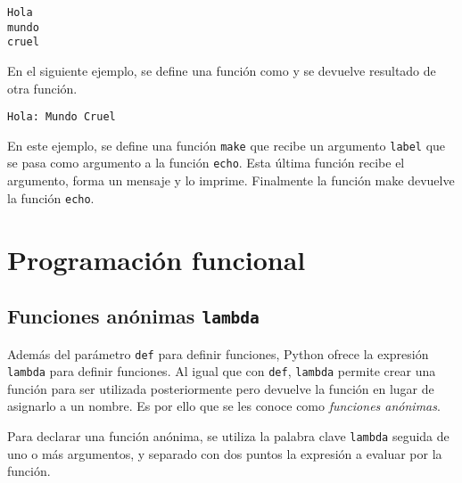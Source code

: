 \begin{verbatim}
Hola
mundo
cruel
\end{verbatim}

En el siguiente ejemplo, se define una función como y se devuelve
resultado de otra función.

\begin{Shaded}
\begin{Highlighting}[]
        \OperatorTok{+} \StringTok{\textquotesingle{}:\textquotesingle{}} \OperatorTok{+}

\OperatorTok{=}\NormalTok{)}
\NormalTok{)}
\end{Highlighting}
\end{Shaded}

\begin{verbatim}
Hola: Mundo Cruel
\end{verbatim}

En este ejemplo, se define una función \texttt{make} que recibe un
argumento \texttt{label} que se pasa como argumento a la función
\texttt{echo}. Esta última función recibe el argumento, forma un mensaje
y lo imprime. Finalmente la función make devuelve la función
\texttt{echo}.

\section{Programación funcional}

\subsection{\texorpdfstring{Funciones anónimas \texttt{lambda}}{Funciones anónimas lambda}}

Además del parámetro \texttt{def} para definir funciones, Python ofrece
la expresión \texttt{lambda} para definir funciones. Al igual que con
\texttt{def}, \texttt{lambda} permite crear una función para ser
utilizada posteriormente pero devuelve la función en lugar de asignarlo
a un nombre. Es por ello que se les conoce como \emph{funciones
anónimas}.

Para declarar una función anónima, se utiliza la palabra clave
\texttt{lambda} seguida de uno o más argumentos, y separado con dos
puntos la expresión a evaluar por la función.

